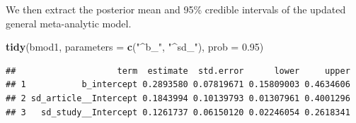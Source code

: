 \documentclass[floatsintext,doc]{apa6}
\newenvironment{Shaded}{\begin{snugshade}}{\end{snugshade}}
\newcommand{\CommentTok}[1]{\textcolor[rgb]{0.56,0.35,0.01}{\textit{#1}}}
\newcommand{\DataTypeTok}[1]{\textcolor[rgb]{0.13,0.29,0.53}{#1}}
\newcommand{\DecValTok}[1]{\textcolor[rgb]{0.00,0.00,0.81}{#1}}
\newcommand{\FloatTok}[1]{\textcolor[rgb]{0.00,0.00,0.81}{#1}}
\newcommand{\KeywordTok}[1]{\textcolor[rgb]{0.13,0.29,0.53}{\textbf{#1}}}
\newcommand{\NormalTok}[1]{#1}
\newcommand{\OperatorTok}[1]{\textcolor[rgb]{0.81,0.36,0.00}{\textbf{#1}}}
\newcommand{\OtherTok}[1]{\textcolor[rgb]{0.56,0.35,0.01}{#1}}
\newcommand{\StringTok}[1]{\textcolor[rgb]{0.31,0.60,0.02}{#1}}
\begin{document}
\begin{Shaded}
\end{Shaded}

We then extract the posterior mean and 95\% credible intervals of the updated general meta-analytic model.

\begin{Shaded}
\begin{Highlighting}[]
\KeywordTok{tidy}\NormalTok{(bmod1, }\DataTypeTok{parameters =} \KeywordTok{c}\NormalTok{(}\StringTok{"^b_"}\NormalTok{, }\StringTok{"^sd_"}\NormalTok{), }\DataTypeTok{prob =} \FloatTok{0.95}\NormalTok{)}
\end{Highlighting}
\end{Shaded}

\begin{verbatim}
##                    term  estimate  std.error      lower     upper
## 1           b_intercept 0.2893580 0.07819671 0.15809003 0.4634606
## 2 sd_article__Intercept 0.1843994 0.10139793 0.01307961 0.4001296
## 3   sd_study__Intercept 0.1261737 0.06150120 0.02246054 0.2618341
\end{verbatim}
\end{document}
